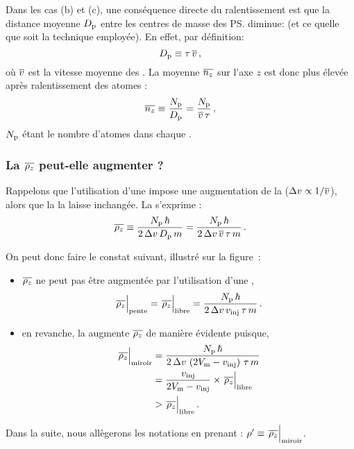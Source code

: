 \label{fig:MiroirPhaseSpaceReflexion}
\efig
%
Dans les cas (b) et (c), une conséquence directe du ralentissement est que la distance moyenne ${D_{\rm p}}$ entre les centres de masse des \ps diminue:%
(et ce quelle que soit la technique employée). En effet, par définition:
\[
 {D_{\rm p}} \equiv \tau\,{\overline{v}}
 \, ,
\]
où ${\overline{v}}$ est la vitesse moyenne des \pats.
La \datlin moyenne ${\overline{n_z}}$ sur l'axe $z$ est donc plus élevée après ralentissement des atomes%
:
\[
	{\overline{n_z}} \equiv \frac{N_{\rm p}}{{D_{\rm p}}} 
	= \frac{N_{\rm p}}{{\overline{v}}\,\tau}
\, ,
\]
$N_{\rm p}$ étant le nombre d'atomes dans chaque \p.


\subsubsection{La \dmdedpup ${\overline{\rho_z}}$ peut-elle augmenter ?}
\noindent Rappelons que l'utilisation d'une \secpent impose une augmentation de la \dispvitlong (${\Delta v}\propto{{1} / {{\overline{v}}}}$), alors que la \techmimo la laisse inchangée.
La \dmdedpup s'exprime%
:
\begin{equation}
	\rhomoyz \equiv \frac{\Npat\,\hbar}{\DeltaVPaquet\,\distpat\,m} 
	= \frac{\Npat\,\hbar}{\DeltaVPaquet\,\vmoy\,\Trep\,m}
\pointformule
	\label{eq:RhoMoyZ}
\end{equation} 

\noindent On peut donc faire le constat suivant, illustré sur la figure~:
\begin{itemize}
	\item ${\overline{\rho_z}}$ ne peut pas être augmentée par l'utilisation d'une \secpent,
	\[
	\rhomoypente = \rhomoylibre = \frac{\Npat\,\hbar}{\DeltaVPaquet\,\vinj\,\Trep\,m}
	\pointformule
	\]
	\item en revanche, la \techmimo augmente ${\overline{\rho_z}}$ de manière évidente puisque,
\begin{align}
	\rhomoymiroir &= \frac{\Npat\,\hbar}{\DeltaVPaquet\,\left(2\Vmir-\vinj\right)\,\Trep\,m} 
	\nonumber\\
	&= \frac{\vinj}{2\Vmir-\vinj} \times \rhomoylibre
	\nonumber\\
	&> \rhomoylibre
	\pointformule
	\label{eq:RhoMiroirPlusGrand}
\end{align}	
\end{itemize}
Dans la suite, nous allègerons les notations en prenant : $\rhomoym\equiv\rhomoymiroir$.%
%

